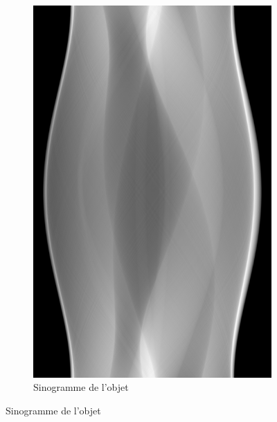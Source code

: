 \documentclass{article}
\theoremstyle{definition}
\theoremstyle{remark}
\theoremstyle{plain}
\theoremstyle{definition}
\begin{document}
\begin{figure}[h]
\begin{subfigure}{0.17\textwidth}
        \includegraphics[width=\textwidth]{sinogram.png}
        \caption{Sinogramme de l'objet}
    \end{subfigure}
\end{figure}
\newpage
\end{document}
